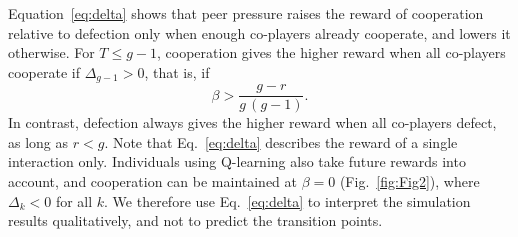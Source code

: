 \documentclass[%
  aip,cha,
  amsmath,amssymb,
  reprint,
  floatfix,
  article-title,
]{revtex4-2}
\begin{document}
Equation~\eqref{eq:delta} shows that peer pressure raises the reward of cooperation relative to defection only when enough co-players already cooperate, and lowers it otherwise. For $T\leq g-1$, cooperation gives the higher reward when all co-players cooperate if $\Delta_{g-1}>0$, that is, if
\begin{equation}
\beta>\frac{g-r}{g\,(g-1)}.
\label{eq:betastar}
\end{equation}
In contrast, defection always gives the higher reward when all co-players defect, as long as $r<g$. Note that Eq.~\eqref{eq:delta} describes the reward of a single interaction only. Individuals using Q-learning also take future rewards into account, and cooperation can be maintained at $\beta=0$ (Fig.~\ref{fig:Fig2}), where $\Delta_k<0$ for all $k$. We therefore use Eq.~\eqref{eq:delta} to interpret the simulation results qualitatively, and not to predict the transition points.

\renewcommand{\bibsection}{\section*{References}}

\end{document}
